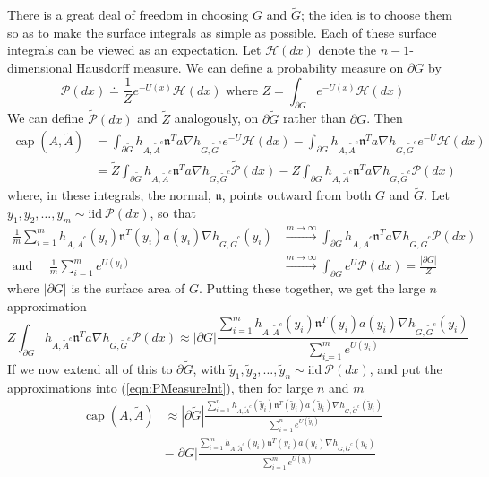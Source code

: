 \documentclass[12pt, nofootinbib,english, amsmath, amssymb, aps, priprint, graphicx,floatfix,draft]{revtex4-1}
\theoremstyle{plain}
\theoremstyle{definition}
\theoremstyle{plain}
\newcommand{\normal}{{\mathfrak{n}}}
\newcommand{\capac}[2]{\ensuremath{\operatorname{cap}}(#1,#2)}
\newcommand{\hausdorffmeasure}{\mathscr{H}(dx)}
\newcommand{\PMeasure}{\mathscr{P}(dx)}
\newcommand{\tPMeasure}{\tilde{\mathscr P}(dx)}
\begin{document}
There is a great deal of freedom in choosing $G$ and $\tilde G$; the idea is to choose them so as to make the surface integrals as simple as possible.  Each of these surface integrals can be viewed as an expectation.  Let $\hausdorffmeasure$ denote the $n-1$-dimensional Hausdorff measure.  We can define a probability measure on
$\partial G$ by
\[
\PMeasure\doteq\frac{1}{Z}e^{-U(x)}\hausdorffmeasure
\text{   where   }
Z= \int_{\partial G} e^{-U(x)}\hausdorffmeasure
\]
We can define $\tPMeasure$
and $\tilde{Z}$ analogously, on $\partial\tilde{G}$ rather than $\partial G$.
Then
\begin{align}
\capac{A}{\tilde A} & = \int_{\partial\tilde{G}} h_{A, \tilde{A}^c}    \normal^T a  \nabla h_{G, \tilde{G}^c} e^{- U } \hausdorffmeasure
-\int_{\partial G} h_{A, \tilde{A}^c}    \normal^T a  \nabla h_{G, \tilde{G}^c} e^{- U } \hausdorffmeasure
\nonumber \\
&=\tilde Z
\int_{\partial\tilde{G}} h_{A, \tilde{A}^c}    \normal^T a  \nabla h_{G, \tilde{G}^c} \tPMeasure
-Z
\int_{\partial G} h_{A, \tilde{A}^c}    \normal^T a
\nabla h_{G,\tilde{G}^c} \PMeasure
\label{eqn:PMeasureInt}
\end{align}
where, in these integrals, the normal, $\normal$, points outward from both $G$ and $\tilde G$.
Let $y_1,y_2,\dots,y_m\sim \text{iid}\ \PMeasure$, so that
\begin{align*}
\frac{1}{m}\sum_{i=1}^m
h_{A, \tilde{A}^c}(y_i) \normal^T(y_i) a(y_i)  \nabla h_{G,\tilde{G}^c}(y_i) & \stackrel{m\to\infty}{\longrightarrow}
 \int_{\partial G} h_{A, \tilde{A}^c}    \normal^T a
\nabla h_{G,\tilde{G}^c} \PMeasure \\
\text{and}\ \ \ \ \ \ \frac{1}{m}\sum_{i=1}^m e^{U(y_i)}
& \stackrel{m\to\infty}{\longrightarrow} \int_{\partial G} e^U
\PMeasure = \frac{|\partial G|}{Z}
\end{align*}
where $|\partial G|$ is the surface area of $G$. Putting these together, we get the large $n$ approximation
\[
Z
\int_{\partial G} h_{A, \tilde{A}^c}    \normal^T a
\nabla h_{G,\tilde{G}^c} \PMeasure
\approx
|\partial G|
\frac{\sum_{i=1}^m
h_{A, \tilde{A}^c}(y_i) \normal^T(y_i) a(y_i)  \nabla h_{G,\tilde{G}^c}(y_i)}
{\sum_{i=1}^m e^{U(y_i)}}
\]
If we now extend all of this to $\partial\tilde{G}$, with
$\tilde{y}_1,\tilde{y}_2,\dots,\tilde{y}_n\sim \text{iid}\ \tPMeasure$, and put the approximations into
(\ref{eqn:PMeasureInt}), then for large $n$ and $m$
\begin{align}
\capac{A}{\tilde A} & \approx
|\partial\tilde{G}|
\frac{\sum_{i=1}^n
h_{A, \tilde{A}^c}(\tilde{y}_i) \normal^T(\tilde{y}_i) a(\tilde{y}_i)  \nabla h_{G,\tilde{G}^c}(\tilde{y}_i)}
{\sum_{i=1}^n e^{U(\tilde{y}_i)}}
\label{eqn:approximate_capacity}\\
& -|\partial G|
\frac{\sum_{i=1}^m
h_{A, \tilde{A}^c}(y_i) \normal^T(y_i) a(y_i)  \nabla h_{G,\tilde{G}^c}(y_i)}
{\sum_{i=1}^m e^{U(y_i)}}
\nonumber
\end{align}
\end{document}
